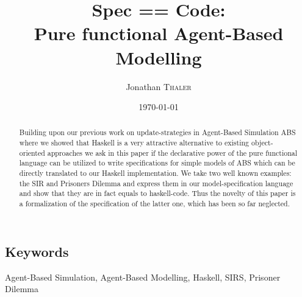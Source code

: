 \documentclass{article}
\title{Spec == Code:\\Pure functional Agent-Based Modelling} %
\author{Jonathan \textsc{Thaler}} %
\date{\today} %
\begin{document}
\maketitle %

\begin{abstract}
Building upon our previous work on update-strategies in Agent-Based Simulation ABS where we showed that Haskell is a very attractive alternative to existing object-oriented approaches we ask in this paper if the declarative power of the pure functional language can be utilized to write specifications for simple models of ABS which can be directly translated to our Haskell implementation. We take two well known examples: the SIR and Prisoners Dilemma and express them in our model-specification language and show that they are in fact equals to haskell-code. Thus the novelty of this paper is a formalization of the specification of the latter one, which has been so far neglected.
\end{abstract}

\subsection*{Keywords}
Agent-Based Simulation, Agent-Based Modelling, Haskell, SIRS, Prisoner Dilemma














 







\newpage



\end{document}
